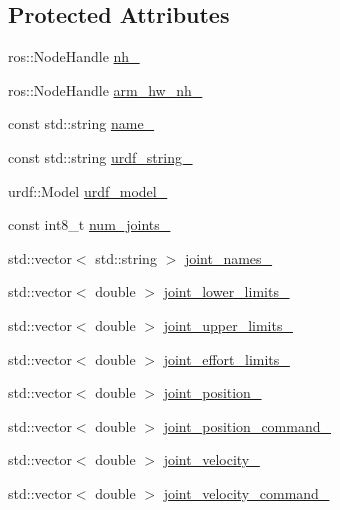 \subsection*{Protected Attributes}
\begin{DoxyCompactItemize}
\item 
ros\+::\+Node\+Handle \hyperlink{classuwrt_1_1arm_1_1_arm_h_w_a80bff071cccf662191970b5088619a29}{nh\+\_\+}
\item 
ros\+::\+Node\+Handle \hyperlink{classuwrt_1_1arm_1_1_arm_h_w_a47b8fb1ffec74c5699b3d32827b4f5b6}{arm\+\_\+hw\+\_\+nh\+\_\+}
\item 
const std\+::string \hyperlink{classuwrt_1_1arm_1_1_arm_h_w_a94577174f3c73549997c501acb28810a}{name\+\_\+}
\item 
const std\+::string \hyperlink{classuwrt_1_1arm_1_1_arm_h_w_a0708e51d21f05e20129b7bc99e42eead}{urdf\+\_\+string\+\_\+}
\item 
urdf\+::\+Model \hyperlink{classuwrt_1_1arm_1_1_arm_h_w_a356557f068878c9464f4d47eb6381ae3}{urdf\+\_\+model\+\_\+}
\item 
const int8\+\_\+t \hyperlink{classuwrt_1_1arm_1_1_arm_h_w_ab1263af2b5e65e88876efdb45025080c}{num\+\_\+joints\+\_\+}
\item 
std\+::vector$<$ std\+::string $>$ \hyperlink{classuwrt_1_1arm_1_1_arm_h_w_a0bba123f549c158be6dbfc365e42853d}{joint\+\_\+names\+\_\+}
\item 
std\+::vector$<$ double $>$ \hyperlink{classuwrt_1_1arm_1_1_arm_h_w_a08c5d50dddb1a3552b43bfff0d07ffa9}{joint\+\_\+lower\+\_\+limits\+\_\+}
\item 
std\+::vector$<$ double $>$ \hyperlink{classuwrt_1_1arm_1_1_arm_h_w_a4073badaad21458259a93fb66f510a9e}{joint\+\_\+upper\+\_\+limits\+\_\+}
\item 
std\+::vector$<$ double $>$ \hyperlink{classuwrt_1_1arm_1_1_arm_h_w_ab6f08fdf70a33a99af148bc5ce0f56ad}{joint\+\_\+effort\+\_\+limits\+\_\+}
\item 
std\+::vector$<$ double $>$ \hyperlink{classuwrt_1_1arm_1_1_arm_h_w_ac6612898a4add151094f92b87cc8ded7}{joint\+\_\+position\+\_\+}
\item 
std\+::vector$<$ double $>$ \hyperlink{classuwrt_1_1arm_1_1_arm_h_w_ab7b253782896e1bc6a1879dcbae60c47}{joint\+\_\+position\+\_\+command\+\_\+}
\item 
std\+::vector$<$ double $>$ \hyperlink{classuwrt_1_1arm_1_1_arm_h_w_abbf5caed643c4c897c4bf5a0c209bff7}{joint\+\_\+velocity\+\_\+}
\item 
std\+::vector$<$ double $>$ \hyperlink{classuwrt_1_1arm_1_1_arm_h_w_aa4acfb5b9cf32153470bc9e384e2fb85}{joint\+\_\+velocity\+\_\+command\+\_\+}

\end{DoxyCompactItemize}
